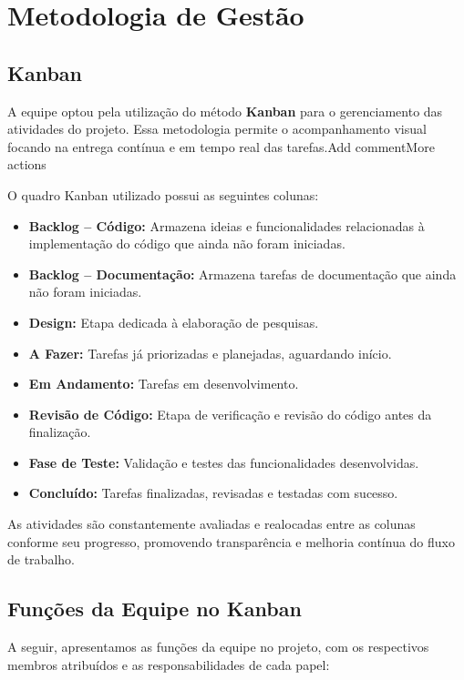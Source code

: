 \documentclass[
	12pt,				%
	openany,			%
	twoside,			%
	a4paper,			%
	english,			%
	brazil				%
	]{abntex2}
\begin{document}
\section{Metodologia de Gestão}

\subsection{Kanban}

A equipe optou pela utilização do método \textbf{Kanban} para o gerenciamento das atividades do projeto. Essa metodologia permite o acompanhamento visual focando na entrega contínua e em tempo real das tarefas.Add commentMore actions

O quadro Kanban utilizado possui as seguintes colunas:

\begin{itemize}
    \item \textbf{Backlog – Código:} Armazena ideias e funcionalidades relacionadas à implementação do código que ainda não foram iniciadas.
    \item \textbf{Backlog – Documentação:} Armazena tarefas de documentação que ainda não foram iniciadas.
    \item \textbf{Design:} Etapa dedicada à elaboração de pesquisas.
    \item \textbf{A Fazer:} Tarefas já priorizadas e planejadas, aguardando início.
    \item \textbf{Em Andamento:} Tarefas em desenvolvimento.
    \item \textbf{Revisão de Código:} Etapa de verificação e revisão do código antes da finalização.
    \item \textbf{Fase de Teste:} Validação e testes das funcionalidades desenvolvidas.
    \item \textbf{Concluído:} Tarefas finalizadas, revisadas e testadas com sucesso.
\end{itemize}

As atividades são constantemente avaliadas e realocadas entre as colunas conforme seu progresso, promovendo transparência e melhoria contínua do fluxo de trabalho.

\subsection{Funções da Equipe no Kanban}

A seguir, apresentamos as funções da equipe no projeto, com os respectivos membros atribuídos e as responsabilidades de cada papel:
\end{document}
